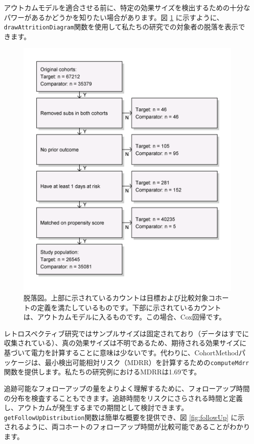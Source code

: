 \documentclass[
  11pt]{book}
\theoremstyle{definition}
\theoremstyle{definition}
\theoremstyle{definition}
\theoremstyle{definition}
\theoremstyle{remark}
\begin{document}
アウトカムモデルを適合させる前に、特定の効果サイズを検出するための十分なパワーがあるかどうかを知りたい場合があります。図 \ref{fig:attrition} に示すように、\texttt{drawAttritionDiagram}関数を使用して私たちの研究での対象者の脱落を表示できます。 

\begin{figure}

{\centering \includegraphics[width=0.7\linewidth]{images/PopulationLevelEstimation/attrition} 

}

\caption{脱落図。上部に示されているカウントは目標および比較対象コホートの定義を満たしているものです。下部に示されているカウントは、アウトカムモデルに入るものです。この場合、Cox回帰です。}\label{fig:attrition}
\end{figure}

レトロスペクティブ研究ではサンプルサイズは固定されており（データはすでに収集されている）、真の効果サイズは不明であるため、期待される効果サイズに基づいて電力を計算することに意味は少ないです。代わりに、CohortMethodパッケージは、最小検出可能相対リスク（MDRR）を計算するための\texttt{computeMdrr}関数を提供します。私たちの研究例におけるMDRRは1.69です。  

追跡可能なフォローアップの量をよりよく理解するために、フォローアップ時間の分布を検査することもできます。追跡時間をリスクにさらされる時間と定義し、アウトカムが発生するまでの期間として検討できます。\texttt{getFollowUpDistribution}関数は簡単な概要を提供でき、図 \ref{fig:followUp} に示されるように、両コホートのフォローアップ時間が比較可能であることがわかります。
\end{document}
